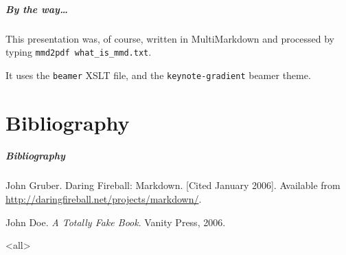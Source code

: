 \begin{frame}

\frametitle{By the way{\ldots}}
\label{bytheway}

This presentation was, of course, written in MultiMarkdown and processed by
typing \texttt{mmd2pdf what\_is\_mmd.txt}.

It uses the \texttt{beamer} XSLT file, and the \texttt{keynote-gradient} beamer theme.

\end{frame}

\part{Bibliography}
\begin{frame}[allowframebreaks]
\frametitle{Bibliography}
\def\newblock{}
\begin{thebibliography}{0}
John Gruber. Daring Fireball: Markdown. [Cited January 2006]. Available from \href{http://daringfireball.net/projects/markdown/}{http:\slash \slash daringfireball.net\slash projects\slash markdown\slash }.


John Doe. \emph{A Totally Fake Book}. Vanity Press, 2006.


\end{thebibliography}
\end{frame}

\mode<all>


\mode*


